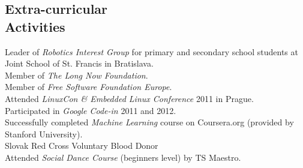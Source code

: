 \documentclass[margin]{res}
\begin{document}
\begin{resume}
\section{Extra-curricular \\ Activities}
Leader of {\it Robotics Interest Group} for primary and secondary school students at Joint School of St. Francis in Bratislava. \\
Member of {\it The Long Now Foundation}. \\
Member of {\it Free Software Foundation Europe}. \\
Attended {\it LinuxCon \& Embedded Linux Conference} 2011 in Prague. \\
Participated in {\it Google Code-in} 2011 and 2012. \\
Successfully completed {\it Machine Learning} course on Coursera.org (provided by Stanford University). \\
Slovak Red Cross Voluntary Blood Donor \\
Attended {\it Social Dance Course} (beginners level) by TS Maestro.
\end{resume}
\end{document}
